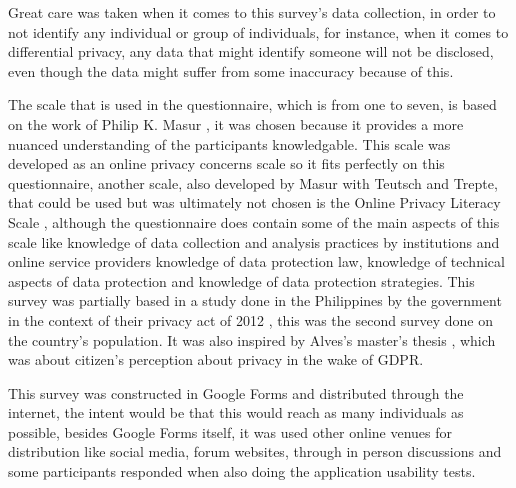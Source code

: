 Great care was taken when it comes to this survey's data collection, in
order to not identify any individual or group of individuals, for
instance, when it comes to differential privacy, any data that might
identify someone will not be disclosed, even though the data might suffer
from some inaccuracy because of this.

The scale that is used in the questionnaire, which is from one to seven,
is based on the work of Philip K. Masur \cite{masur2018situational}, it
was chosen because it provides a more nuanced understanding
of the participants knowledgable. This scale was developed as an
online privacy concerns scale so it fits perfectly on this questionnaire,
another scale, also developed by Masur with Teutsch and Trepte,
that could be used but was ultimately not chosen is the Online Privacy
Literacy Scale \cite{masur2017entwicklung}, although the questionnaire does
contain some of the main aspects of this scale like knowledge of data collection and
analysis practices by institutions and online service providers
knowledge of data protection law, knowledge of technical aspects of data
protection and knowledge of data protection strategies.
This survey was partially based in a study done in the Philippines by the
government in the context of their privacy act of 2012 \cite{Philippine2022Conduct},
this was the second survey done on the country's population. It was also
inspired by Alves's master's thesis \cite{alves2021}, which was about citizen's
perception about privacy in the wake of GDPR.

This survey was constructed in Google Forms and distributed through the internet,
the intent would be that this would reach as many individuals as possible,
besides Google Forms itself, it was used other online venues for distribution
like social media, forum websites, through in person discussions and
some participants responded when also doing the application usability tests.

